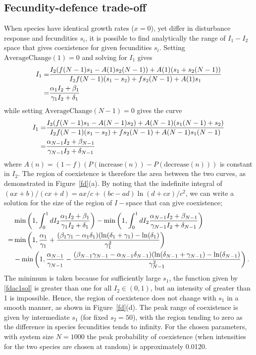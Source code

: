 \documentclass[preprint,10pt,reqno]{amsart}
\begin{document}
\subsection{Fecundity-defence trade-off}
When species have identical growth rates ($x=0$), yet differ in disturbance response and fecundities $s_i$, it is possible to find analytically the range of $I_1 - I_2$ space that gives coexistence for given fecundities $s_i$. Setting $\text{AverageChange}(1)=0$ and solving for $I_1$ gives
\begin{align}
\label{fdac1sol}
I_1=&\frac{I_2(f(N-1)s_1-A(1)s_2(N-1)) +A(1)(s_1+s_2(N-1))}{I_2f(N-1)(s_1-s_2) +fs_2(N-1) +A(1)s_1}\notag \\
=&\frac{\alpha_1 I_2 +\beta_1}{\gamma_1 I_2+\delta_1}
\end{align}
while setting $\text{AverageChange}(N-1)=0$ gives the curve
\begin{align}
\label{fdacnsol}
I_1=&\frac{I_2(f(N-1)s_1-A(N-1)s_2) +A(N-1)(s_1(N-1)+s_2)}{I_2f(N-1)(s_1-s_2) +fs_2(N-1) +A(N-1)s_1(N-1)}\notag \\
=&\frac{\alpha_{N-1} I_2 +\beta_{N-1}}{\gamma_{N-1} I_2+\delta_{N-1}}
\end{align}
where $A(n)=(1-f)(P(\text{increase}(n))-P(\text{decrease}(n)))$ is constant in $I_2$. The region of coexistence is therefore the area between the two curves, as demonstrated in Figure~\ref{fd}(a). By noting that the indefinite integral of $(a x +b)/(c x +d) = ax/c+(bc-ad)\ln(d+cx)/c^2$, we can write a solution for the size of the region of $I-$space that can give coexistence;
\begin{align}
&\min \left(1, \int_0^1 dI_2 \frac{\alpha_1 I_2 +\beta_1}{\gamma_1 I_2+\delta_1} \right) - \min \left(1, \int_0^1 dI_2 \frac{\alpha_{N-1} I_2 +\beta_{N-1}}{\gamma_{N-1} I_2+\delta_{N-1}} \right) \notag \\
=&\min\left(1,\frac{\alpha_1}{\gamma_1}+\frac{(\beta_1 \gamma_1 - \alpha_1 \delta_1)(\ln(\delta_1 +\gamma_1)-\ln(\delta_1)}{\gamma_1^2}\right) \\
&-\min \left(1,\frac{\alpha_{N-1}}{\gamma_{N-1}}-\frac{(\beta_{N-1} \gamma_{N-1} - \alpha_{N-1} \delta_{N-1})(\ln(\delta_{N-1} +\gamma_{N-1})-\ln(\delta_{N-1})}{\gamma_{N-1}^2}\right). \notag
\end{align}
The minimum is taken because for sufficiently large $s_1$, the function given by \eqref{fdac1sol} is greater than one for all $I_2 \in (0,1)$, but an intensity of greater than 1 is impossible. Hence, the region of coexistence does not change with $s_1$ in a smooth manner, as shown in Figure~\ref{fd}(d). The peak range of coexistence is given by intermediate $s_1$ (for fixed $s_2=50$), with the region tending to zero as the difference in species fecundities tends to infinity. For the chosen parameters, with system size $N=1000$ the peak probability of coexistence (when intensities for the two species are chosen at random) is approximately 0.0120.
\end{document}

